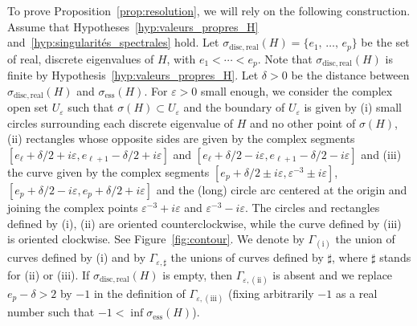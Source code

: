 \documentclass[AHL,Unicode,longabstracts,published]{cedram}
\newcommand{\ess}{\mathrm{ess}}
\newcommand{\disc}{\mathrm{disc}}
\newcommand{\ess}{\mathrm{ess}}
\begin{document}
To prove Proposition~\ref{prop:resolution}, we will rely on the following construction. Assume that Hypotheses~\ref{hyp:valeurs_propres_H} and~\ref{hyp:singularités_spectrales} hold. Let $\sigma_{\disc,\mathrm{real}}(H)=\{e_1,\,\dots,\,e_p\}$ be the set of real, discrete eigenvalues of $H$, with $e_1<\cdots<e_p$. Note that $\sigma_{\disc,\mathrm{real}}(H)$ is finite by Hypothesis~\ref{hyp:valeurs_propres_H}. Let $\delta>0$ be the distance between $\sigma_{\disc,\mathrm{real}}(H)$ and $\sigma_{\ess}(H)$. For $\varepsilon>0$ small enough, we consider the complex open set $U_\varepsilon$ such that $\sigma(H)\subset U_\varepsilon$ and the boundary of $U_\varepsilon$ is given by (i) small circles surrounding each discrete eigenvalue of $H$ and no other point of $\sigma(H)$, (ii) rectangles whose opposite sides are given by the complex segments $[e_\ell + \delta/2 + i\varepsilon, e_{\ell+1}-\delta/2 + i\varepsilon]$ and $[e_\ell + \delta/2 - i\varepsilon, e_{\ell+1}-\delta/2 - i\varepsilon]$ and (iii) the curve given by the complex segments $[e_p+\delta/2\pm i\varepsilon,\varepsilon^{-3}\pm i\varepsilon]$, $[e_p+\delta/2-i\varepsilon,e_p+\delta/2+i\varepsilon]$ and the (long) circle arc centered at the origin and joining the complex points $\varepsilon^{-3}+ i\varepsilon$ and $\varepsilon^{-3}- i\varepsilon$. The circles and rectangles defined by (i), (ii) are oriented counterclockwise, while the curve defined by (iii) is oriented clockwise. See Figure~\ref{fig:contour}. We denote by $\Gamma_{\mathrm{(i)}}$ the union of curves defined by (i) and by $\Gamma_{\varepsilon,\sharp}$ the unions of curves defined by $\sharp$, where $\sharp$ stands for (ii) or (iii). If $\sigma_{\disc,\mathrm{real}}(H)$ is empty, then $\Gamma_{\varepsilon,\mathrm{(ii)}}$ is absent and we replace $e_p-\delta>2$ by $-1$ in the definition of $\Gamma_{\varepsilon,\mathrm{(iii)}}$ (fixing arbitrarily $-1$ as a real number such that $-1<\inf\sigma_{\ess}(H)$).
\end{document}
